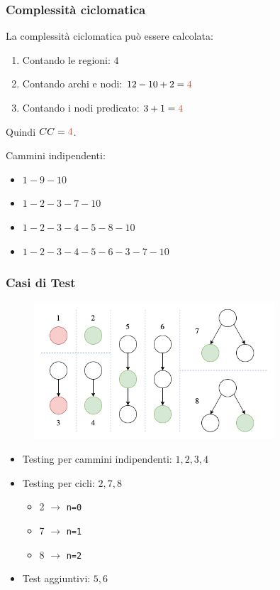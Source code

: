 \begin{frame}
    \frametitle{Complessità ciclomatica}
    La complessità ciclomatica può essere calcolata:
    \begin{enumerate}
        \item Contando le regioni: {\color{red}$4$}
        \item Contando archi e nodi: $12-10+2={\color{red}4}$
        \item Contando i nodi predicato: $3+1={\color{red}4}$
    \end{enumerate}
    Quindi $CC={\color{red}4}$.

    Cammini indipendenti:
    \begin{itemize}
        \item $1-9-10$
        \item $1-2-3-7-10$
        \item $1-2-3-4-5-8-10$
        \item $1-2-3-4-5-6-3-7-10$
    \end{itemize}
\end{frame}

\begin{frame}
    \frametitle{Casi di Test}
    \begin{figure}
        \includegraphics[width=0.8\textwidth]{img/casiTestWhiteBox.png}
    \end{figure}
    \begin{itemize}
        \item Testing per cammini indipendenti: $1, 2, 3, 4$
        \item Testing per cicli: $2, 7, 8$
        \begin{itemize}
            \item 2 $\to$ \texttt{n=0}
            \item 7 $\to$ \texttt{n=1}
            \item 8 $\to$ \texttt{n=2}
        \end{itemize}
        \item Test aggiuntivi: $5, 6$
    \end{itemize}
\end{frame}

